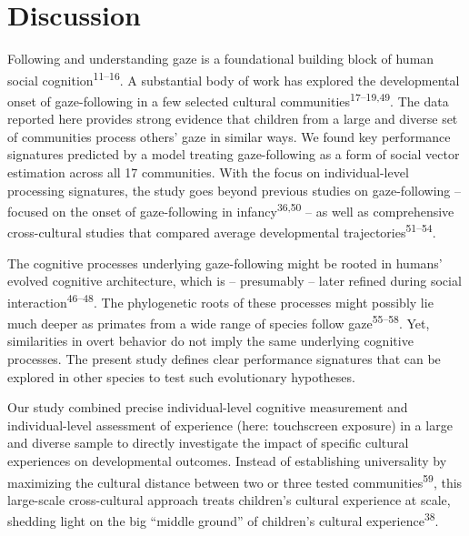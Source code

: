 \documentclass[
  man,floatsintext]{apa6}
\begin{document}
\hypertarget{discussion}{%
\section{Discussion}\label{discussion}}

Following and understanding gaze is a foundational building block of human social cognition\textsuperscript{11--16}. A substantial body of work has explored the developmental onset of gaze-following in a few selected cultural communities\textsuperscript{17--19,49}. The data reported here provides strong evidence that children from a large and diverse set of communities process others' gaze in similar ways. We found key performance signatures predicted by a model treating gaze-following as a form of social vector estimation across all 17 communities. With the focus on individual-level processing signatures, the study goes beyond previous studies on gaze-following -- focused on the onset of gaze-following in infancy\textsuperscript{36,50} -- as well as comprehensive cross-cultural studies that compared average developmental trajectories\textsuperscript{51--54}.

The cognitive processes underlying gaze-following might be rooted in humans' evolved cognitive architecture, which is -- presumably -- later refined during social interaction\textsuperscript{46--48}. The phylogenetic roots of these processes might possibly lie much deeper as primates from a wide range of species follow gaze\textsuperscript{55--58}. Yet, similarities in overt behavior do not imply the same underlying cognitive processes. The present study defines clear performance signatures that can be explored in other species to test such evolutionary hypotheses.

Our study combined precise individual-level cognitive measurement and individual-level assessment of experience (here: touchscreen exposure) in a large and diverse sample to directly investigate the impact of specific cultural experiences on developmental outcomes. Instead of establishing universality by maximizing the cultural distance between two or three tested communities\textsuperscript{59}, this large-scale cross-cultural approach treats children's cultural experience at scale, shedding light on the big ``middle ground'' of children's cultural experience\textsuperscript{38}.
\end{document}
